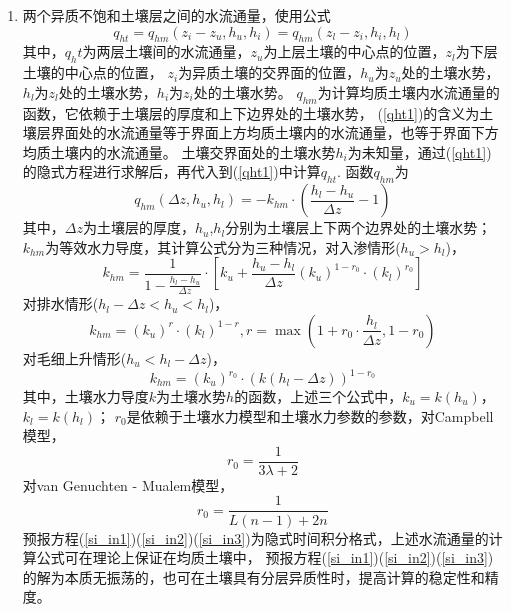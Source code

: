 \begin{enumerate}
    \item 两个异质不饱和土壤层之间的水流通量，使用公式
    \begin{equation}\label{qht1}
        q_{h t}=q_{h m}\left(z_{i}-z_{u}, h_{u}, h_{i}\right)=q_{h m}\left(z_{l}-z_{i}, h_{i}, h_{l}\right)
        \end{equation}
        其中，$q_ht$为两层土壤间的水流通量，$z_u$为上层土壤的中心点的位置，$z_l$为下层土壤的中心点的位置，
        $z_i$为异质土壤的交界面的位置，$h_u$为$z_u$处的土壤水势，$h_l$为$z_l$处的土壤水势，$h_i$为$z_i$处的土壤水势。
        $q_{hm}$为计算均质土壤内水流通量的函数，它依赖于土壤层的厚度和上下边界处的土壤水势，
        (\ref{qht1})的含义为土壤层界面处的水流通量等于界面上方均质土壤内的水流通量，也等于界面下方均质土壤内的水流通量。
        土壤交界面处的土壤水势$h_i$为未知量，通过(\ref{qht1})的隐式方程进行求解后，再代入到(\ref{qht1})中计算$q_{ht}$. 函数$q_{hm}$为
        \begin{equation}
        q_{h m}\left(\Delta z, h_{u}, h_{l}\right)=-k_{h m} \cdot\left(\frac{h_{l}-h_{u}}{\Delta z}-1\right)
        \end{equation}
        其中，$\Delta z$为土壤层的厚度，$h_u$,$h_l$分别为土壤层上下两个边界处的土壤水势；
        $k_{hm}$为等效水力导度，其计算公式分为三种情况，对入渗情形($h_u>h_l$)，
        \begin{equation}
        k_{h m}=\frac{1}{1-\frac{h_{l}-h_{u}}{\Delta z}} \cdot\left[k_{u}+\frac{h_{u}-h_{l}}{\Delta z}\left(k_{u}\right)^{1-r_{0}} \cdot\left(k_{l}\right)^{r_{0}}\right]
        \end{equation}
        对排水情形($h_l-\Delta z<h_u<h_l$)，
        \begin{equation}
        k_{h m}=\left(k_{u}\right)^{r} \cdot\left(k_{l}\right)^{1-r}, r=\max \left(1+r_{0} \cdot \frac{h_{l}}{\Delta z}, 1-r_{0}\right)
        \end{equation}
        对毛细上升情形($h_u<h_l-\Delta z$)，
        \begin{equation}
        k_{h m}=\left(k_{u}\right)^{r_{0}} \cdot\left(k\left(h_{l}-\Delta z\right)\right)^{1-r_{0}}
        \end{equation}
        其中，土壤水力导度$k$为土壤水势$h$的函数，上述三个公式中，$k_u=k(h_u )$，$k_l=k(h_l )$；
        $r_0$是依赖于土壤水力模型和土壤水力参数的参数，对Campbell模型，
        \begin{equation}
        r_{0}=\frac{1}{3 \lambda+2}
        \end{equation}
        对van Genuchten - Mualem模型，
        \begin{equation}
        r_{0}=\frac{1}{L(n-1)+2 n}
        \end{equation}
        预报方程(\ref{si_in1})(\ref{si_in2})(\ref{si_in3})为隐式时间积分格式，上述水流通量的计算公式可在理论上保证在均质土壤中，
        预报方程(\ref{si_in1})(\ref{si_in2})(\ref{si_in3})的解为本质无振荡的，也可在土壤具有分层异质性时，提高计算的稳定性和精度。


\end{enumerate}
